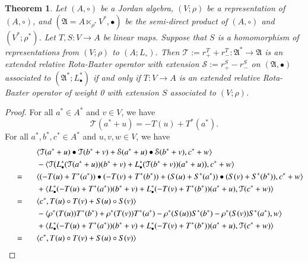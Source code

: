 \documentclass[12pt, reqno, a4paper]{amsart}
\newtheorem{theorem}{Theorem}[section]
\theoremstyle{definition}
\begin{document}
\begin{theorem}\label{thm:eo2smp}
	Let $(A, \circ)$ be a Jordan algebra, $(V; \rho)$ be a representation of $(A, \circ)$, and $(\mathfrak{A}=A \ltimes_{\rho^*} V^*, \bullet)$ be the semi-direct product of $(A, \circ)$ and $(V^*; \rho^*)$.
	Let $T, S: V \to A$ be linear maps.
	Suppose that $S$ is a homomorphism of representations from $(V; \rho)$ to $(A; L_{\circ})$.
	Then $\mathcal{T} := r_{+}^{T} + r_{-}^{T}: \mathfrak{A}^* \to \mathfrak{A}$ is an extended relative Rota-Baxter operator with extension $\mathcal{S} := r_{+}^{S} - r_{-}^{S}$ on $(\mathfrak{A}, \bullet)$ associated to $(\mathfrak{A}^*; L_{\bullet}^*)$ if and only if $T: V \to A$ is an extended relative Rota-Baxter operator of weight 0 with extension $S$ associated to $(V; \rho)$.
\end{theorem}
\begin{proof}
	For all $a^* \in A^*$ and $v \in V$, we have
	\begin{equation*}
		\mathcal{T}(a^* + u) =  -T(u) + T^*(a^*).
	\end{equation*}
	For all $a^*, b^*, c^* \in A^*$ and $u, v, w \in V$, we have
	\begin{align*}
		&\langle \mathcal{T}(a^* + u) \bullet \mathcal{T}(b^* + v) + \mathcal{S}(a^*+u) \bullet \mathcal{S}(b^*+v), c^*+ w\rangle                             \\
		& - \langle \mathcal{T}\big( L_{\bullet}^*(\mathcal{T}(a^* + u))(b^*+v) + L_{\bullet}^*(\mathcal{T}(b^* + v))(a^*+u)\big), c^*+ w\rangle \\
		\overset{\hphantom{\eqref{eq:ainv}}}{=}\; & \langle (-T(u) + T^*(a^*)) \bullet ( -T(v) + T^*(b^*)) + (S(u) + S^*(a^*)) \bullet (S(v) + S^*(b^*)), c^*+ w\rangle \\
		& + \langle L_{\bullet}^*(-T(u) + T^*(a^*))(b^*+v) + L_{\bullet}^*(-T(v) + T^*(b^*))(a^*+u), \mathcal{T}(c^*+ w) \rangle \\
		\overset{\hphantom{\eqref{eq:ainv}}}{=}\; & \langle c^*, T(u) \circ T(v) + S(u) \circ S(v) \rangle \\
		& - \langle \rho^*(T(u))T^*(b^*) + \rho^*(T(v))T^*(a^*) - \rho^*(S(u))S^*(b^*) - \rho^*(S(v))S^*(a^*), w\rangle                                 \\
		& + \langle L_{\bullet}^*(-T(u) + T^*(a^*) )(b^*+v) + L_{\bullet}^*(-T(v) + T^*(b^*) )(a^*+u), \mathcal{T}(c^* + w)\rangle                    \\
		\overset{\hphantom{\eqref{eq:ainv}}}{=}\; &\langle c^*, T(u) \circ T(v) + S(u) \circ S(v) \rangle \\

\end{align*}
\end{proof}
\end{document}

